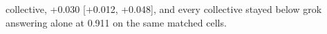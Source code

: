 collective, +0.030 [+0.012, +0.048], and every collective stayed below
grok answering alone at 0.911 on the same matched cells.

